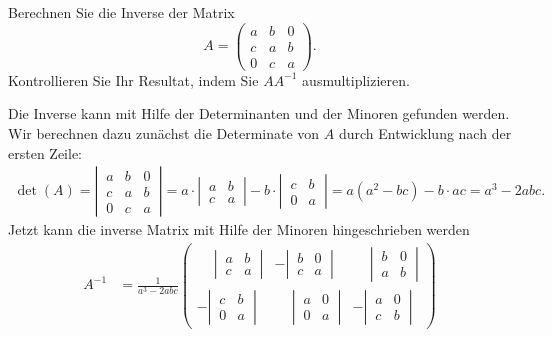 Berechnen Sie die Inverse der Matrix
\[
A=
\begin{pmatrix}
a&b&0\\
c&a&b\\
0&c&a
\end{pmatrix}.
\]
Kontrollieren Sie Ihr Resultat, indem Sie $AA^{-1}$ ausmultiplizieren.


\begin{loesung}
Die Inverse kann mit Hilfe der Determinanten und der Minoren gefunden werden.
Wir berechnen dazu zunächst die Determinate von $A$ durch Entwicklung
nach der ersten Zeile:
\begin{align*}
\det(A)=\left|\,\begin{matrix}
a&b&0\\
c&a&b\\
0&c&a
\end{matrix}\,\right|
=
a
\cdot
\left|\,\begin{matrix}a&b\\c&a\end{matrix}\,\right|
-b
\cdot
\left|\,\begin{matrix}c&b\\0&a\end{matrix}\,\right|
=
a(a^2-bc)-b\cdot ac=a^3-2abc.
\end{align*}
Jetzt kann die inverse Matrix mit Hilfe der Minoren hingeschrieben werden
\begin{align}
A^{-1}
&=
\frac1{a^3-2abc}\begin{pmatrix}
\phantom{-}\left|\,\begin{matrix}a&b\\c&a\end{matrix}\,\right|
	&-\left|\,\begin{matrix}b&0\\c&a\end{matrix}\,\right|
		&\phantom{-}\left|\,\begin{matrix}b&0\\a&b\end{matrix}\,\right|
			\\[13pt]
-\left|\,\begin{matrix}c&b\\0&a\end{matrix}\,\right|
	&\phantom{-}\left|\,\begin{matrix}a&0\\0&a\end{matrix}\,\right|
		&-\left|\,\begin{matrix}a&0\\c&b\end{matrix}\,\right|

\end{pmatrix}
\end{align}
\end{loesung}
